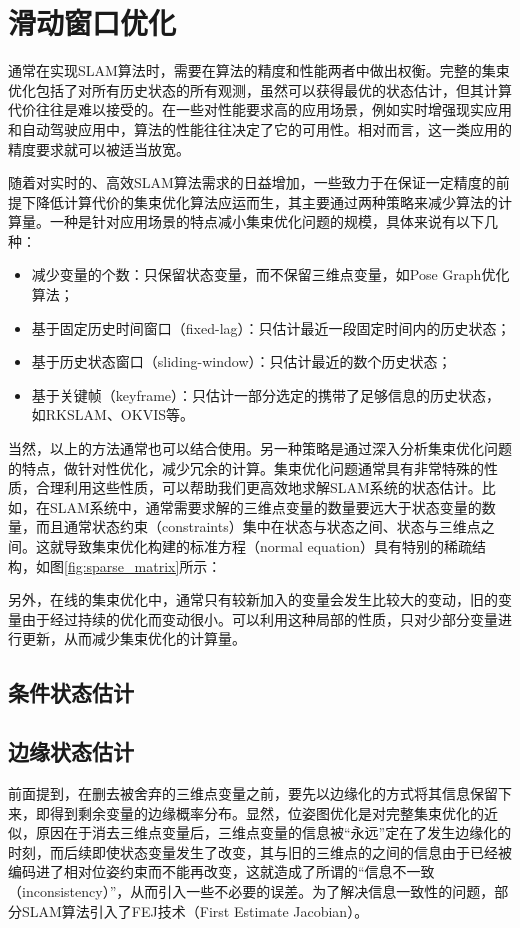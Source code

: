 \section{滑动窗口优化}

通常在实现SLAM算法时，需要在算法的精度和性能两者中做出权衡。完整的集束优化包括了对所有历史状态的所有观测，虽然可以获得最优的状态估计，但其计算代价往往是难以接受的。在一些对性能要求高的应用场景，例如实时增强现实应用和自动驾驶应用中，算法的性能往往决定了它的可用性。相对而言，这一类应用的精度要求就可以被适当放宽。

随着对实时的、高效SLAM算法需求的日益增加，一些致力于在保证一定精度的前提下降低计算代价的集束优化算法应运而生，其主要通过两种策略来减少算法的计算量。一种是针对应用场景的特点减小集束优化问题的规模，具体来说有以下几种：

\begin{itemize}
  \item 减少变量的个数：只保留状态变量，而不保留三维点变量，如Pose Graph优化算法\citep{lu1997globally}；
  \item 基于固定历史时间窗口（fixed-lag\citep{dong2011motion}）：只估计最近一段固定时间内的历史状态；
  \item 基于历史状态窗口（sliding-window\citep{mouragnon2006real}）：只估计最近的数个历史状态；
  \item 基于关键帧（keyframe）：只估计一部分选定的携带了足够信息的历史状态，如RKSLAM\citep{liu2016robust}、OKVIS\citep{leutenegger2015keyframe}等。
\end{itemize}

当然，以上的方法通常也可以结合使用。另一种策略是通过深入分析集束优化问题的特点，做针对性优化，减少冗余的计算。集束优化问题通常具有非常特殊的性质，合理利用这些性质，可以帮助我们更高效地求解SLAM系统的状态估计。比如，在SLAM系统中，通常需要求解的三维点变量的数量要远大于状态变量的数量，而且通常状态约束（constraints）集中在状态与状态之间、状态与三维点之间。这就导致集束优化构建的标准方程（normal equation）具有特别的稀疏结构，如图\ref{fig:sparse_matrix}所示：

另外，在线的集束优化中，通常只有较新加入的变量会发生比较大的变动，旧的变量由于经过持续的优化而变动很小。可以利用这种局部的性质，只对少部分变量进行更新，从而减少集束优化的计算量。

\subsection{条件状态估计}

\subsection{边缘状态估计}

前面提到，在删去被舍弃的三维点变量之前，要先以边缘化的方式将其信息保留下来，即得到剩余变量的边缘概率分布。显然，位姿图优化是对完整集束优化的近似，原因在于消去三维点变量后，三维点变量的信息被“永远”定在了发生边缘化的时刻，而后续即使状态变量发生了改变，其与旧的三维点的之间的信息由于已经被编码进了相对位姿约束而不能再改变，这就造成了所谓的“信息不一致（inconsistency）”，从而引入一些不必要的误差。为了解决信息一致性的问题，部分SLAM算法引入了FEJ技术（First Estimate Jacobian）\citep{huang2008analysis,li2012improving}。
